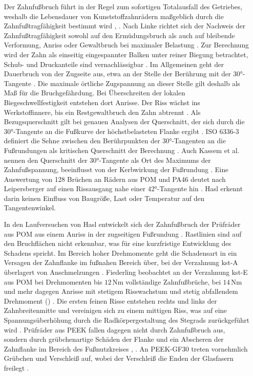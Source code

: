 Der Zahnfußbruch führt in der Regel zum sofortigen Totalausfall des Getriebes, weshalb die Lebensdauer von Kunststoffzahnrädern maßgeblich durch die Zahnfußtragfähigkeit bestimmt wird \cite[S.~8]{Ill22}, \cite[S.~5]{Has18}. Nach Linke richtet sich der Nachweis der Zahnfußtragfähigkeit sowohl auf den Ermüdungsbruch als auch auf bleibende Verformung, Anriss oder Gewaltbruch bei maximaler Belastung \cite[S.~297]{Lin10}. Zur Berechnung wird der Zahn als einseitig eingespannter Balken unter reiner Biegung betrachtet, Schub- und Druckanteile sind vernachlässigbar \cite[S.~8]{Ill22}. Im Allgemeinen geht der Dauerbruch von der Zugseite aus, etwa an der Stelle der Berührung mit der $30$°-Tangente \cite[S.~147]{NieWin03}. Die maximale örtliche Zugspannung an dieser Stelle gilt deshalb als Maß für die Bruchgefährdung. Bei Überschreiten der lokalen Biegeschwellfestigkeit entstehen dort Anrisse. Der Riss wächst ins Werkstoffinnere, bis ein Restgewaltbruch den Zahn abtrennt \cite[S.~8]{Ill22}. Als Bezugsquerschnitt gilt bei genauen Analysen der Querschnitt, der sich durch die $30$°-Tangente an die Fußkurve der höchstbelasteten Flanke ergibt \cite[S.~167]{Lin10}. ISO 6336-3 definiert die Sehne zwischen den Berührpunkten der $30$°-Tangenten an die Fußrundungen als kritischen Querschnitt der Berechnung \cite[S.~14]{ISO6336-3}. Auch Kassem et al. nennen den Querschnitt der $30$°-Tangente als Ort des Maximums der Zahnfußspannung, beeinflusst von der Kerbwirkung der Fußrundung \cite[S.~2]{Kas22}. Eine Auswertung von 128 Brüchen an Rädern aus POM und PA46 deutet nach Leipersberger auf einen Rissausgang nahe einer $42$°-Tangente hin \cite[S.~8]{Fie23}. Hasl erkennt darin keinen Einfluss von Baugröße, Last oder Temperatur auf den Tangentenwinkel.

In den Laufversuchen von Hasl entwickelt sich der Zahnfußbruch der Prüfräder aus POM aus einem Anriss in der zugseitigen Fußrundung \cite[S.~93]{Has18}. Rastlinien sind auf den Bruchflächen nicht erkennbar, was für eine kurzfristige Entwicklung des Schadens spricht. Im Bereich hoher Drehmomente geht die Schadensart in ein Versagen der Zahnflanke im fußnahen Bereich über, bei der Verzahnung kst-A überlagert von Anschmelzungen \cite[S.~93 f.]{Has18}. Fiederling beobachtet an der Verzahnung kst-E aus POM bei Drehmomenten bis $12$\,Nm vollständige Zahnfußbrüche, bei $14$\,Nm und mehr dagegen Anrisse mit stetigem Risswachstum und stetig abfallendem Drehmoment () \cite[S.~66 f.]{Fie23}. Die ersten feinen Risse entstehen rechts und links der Zahnbreitenmitte und vereinigen sich zu einem mittigen Riss, was auf eine Spannungsüberhöhung durch die Radkörpergestaltung des Stegrads zurückgeführt wird \cite[S.~67]{Fie23}. Prüfräder aus PEEK fallen dagegen nicht durch Zahnfußbruch aus, sondern durch grübchenartige Schäden der Flanke und ein Abscheren der Zahnflanke im Bereich des Fußnutzkreises \cite[S.~135]{Has18}, \cite[S.~76]{Fie23}. An PEEK-GF30 treten vornehmlich Grübchen und Verschleiß auf, wobei der Verschleiß die Enden der Glasfasern freilegt \cite[S.~78]{Fie23}.

